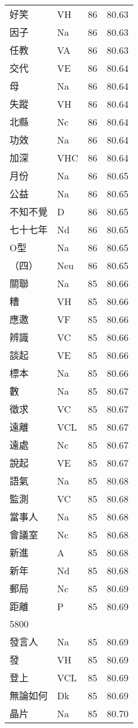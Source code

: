 \documentclass[twocolumn]{book}
\begin{document}
\begin{supertabular}{llrr}
好笑 & VH & 86 &  80.63\\
因子 & Na & 86 &  80.63\\
任教 & VA & 86 &  80.63\\
交代 & VE & 86 &  80.64\\
母 & Na & 86 &  80.64\\
失蹤 & VH & 86 &  80.64\\
北縣 & Nc & 86 &  80.64\\
功效 & Na & 86 &  80.64\\
加深 & VHC & 86 &  80.64\\
月份 & Na & 86 &  80.65\\
公益 & Na & 86 &  80.65\\
不知不覺 & D & 86 &  80.65\\
七十七年 & Nd & 86 &  80.65\\
O型 & Na & 86 &  80.65\\
（四） & Neu & 86 &  80.65\\
關聯 & Na & 85 &  80.66\\
糟 & VH & 85 &  80.66\\
應邀 & VF & 85 &  80.66\\
辨識 & VC & 85 &  80.66\\
談起 & VE & 85 &  80.66\\
標本 & Na & 85 &  80.66\\
數 & Na & 85 &  80.67\\
徵求 & VC & 85 &  80.67\\
遠離 & VCL & 85 &  80.67\\
遠處 & Nc & 85 &  80.67\\
說起 & VE & 85 &  80.67\\
語氣 & Na & 85 &  80.68\\
監測 & VC & 85 &  80.68\\
當事人 & Na & 85 &  80.68\\
會議室 & Nc & 85 &  80.68\\
新進 & A & 85 &  80.68\\
新年 & Nd & 85 &  80.68\\
郵局 & Nc & 85 &  80.69\\
距離 & P & 85 &  80.69\\
5800\\
發言人 & Na & 85 &  80.69\\
發 & VH & 85 &  80.69\\
登上 & VCL & 85 &  80.69\\
無論如何 & Dk & 85 &  80.69\\
晶片 & Na & 85 &  80.70\\

\end{supertabular}
\end{document}
